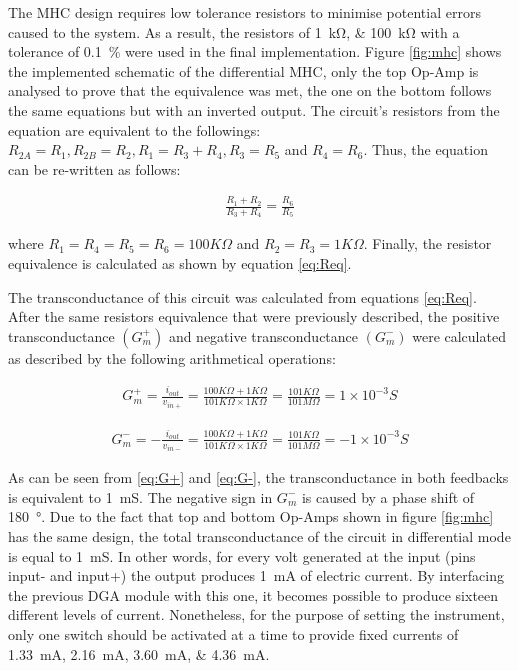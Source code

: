 The MHC design requires low tolerance resistors to minimise potential errors caused to the system. As a result, the resistors of \SIlist{1;100}{\kohm} with a tolerance of \SI{0.1}{\percent} were used in the final implementation. Figure \ref{fig:mhc} shows the implemented schematic of the differential MHC, only the top Op-Amp is analysed to prove that the equivalence was met, the one on the bottom follows the same equations but with an inverted output. The circuit's resistors from the equation are equivalent to the followings: $R_{2A}=R_1, R_{2B}=R_2, R_1 = R_3 + R_4, R_3 = R_5$ and $R_4 = R_6$. Thus, the equation can be re-written as follows: 

\begin{align}
	\label{eq:Req}
	\frac{R_1 + R_2}{R_3 + R_4} = \frac{R_6}{R_5}
\end{align}

where $R_1=R_4=R_5=R_6=100K\Omega$ and $R_2=R_3=1K\Omega$. Finally, the resistor equivalence is calculated as shown by equation \ref{eq:Req}. 

The transconductance of this circuit was calculated from equations \ref{eq:Req}. After the same resistors equivalence that were previously described, the positive transconductance $(G^+_m)$ and negative transconductance $(G^-_m)$ were calculated as described by the following arithmetical operations:

\begin{align}
	\label{eq:G+}
	G^+_m=\frac{i_{out}}{v_{in+}}=\frac{100K\Omega + 1K\Omega}{101K\Omega \times 1K\Omega}=\frac{101K\Omega}{101M\Omega}=1\times10^{-3}S 
\end{align}

\begin{align}
	\label{eq:G-}
	G^-_m=-\frac{i_{out}}{v_{in-}}=\frac{100K\Omega + 1K\Omega}{101K\Omega \times 1K\Omega}=\frac{101K\Omega}{101M\Omega}=-1\times10^{-3}S 
\end{align}

As can be seen from \ref{eq:G+} and \ref{eq:G-}, the transconductance in both feedbacks is equivalent to \SI{1}{\milli\siemens}. The negative sign in $G^{-}_m$ is caused by a phase shift of \SI{180}{\degree}. Due to the fact that top and bottom Op-Amps shown in figure \ref{fig:mhc} has the same design, the total transconductance of the circuit in differential mode is equal to \SI{1}{\milli\siemens}. In other words, for every volt generated at the input (pins input- and input+) the output produces \SI{1}{\mA} of electric current. By interfacing the previous DGA module with this one, it becomes possible to produce sixteen different levels of current. Nonetheless, for the purpose of setting the instrument, only one switch should be activated at a time to provide fixed currents of \SIlist{1.33;2.16;3.60;4.36}{\mA}.

